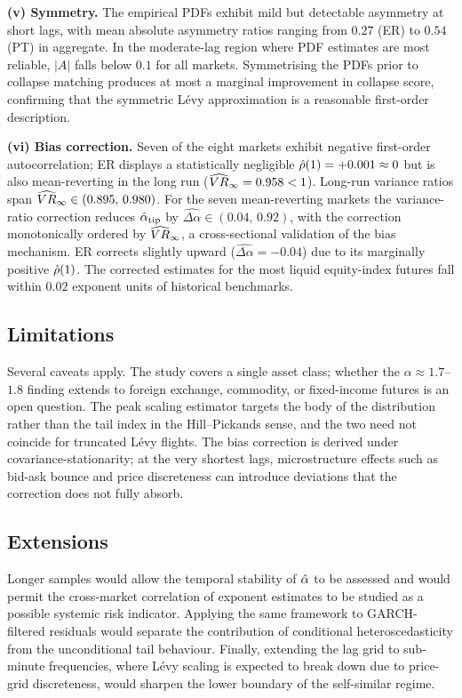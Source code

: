 \documentclass[12pt,a4paper]{article}
\begin{document}
\begin{table}[htbp]
\textbf{(v) Symmetry.}
The empirical PDFs exhibit mild but detectable asymmetry at short lags,
with mean absolute asymmetry ratios ranging from $0.27$ (ER) to $0.54$ (PT)
in aggregate.
In the moderate-lag region where PDF estimates are most reliable, $|A|$
falls below $0.1$ for all markets.
Symmetrising the PDFs prior to collapse matching produces at most a marginal
improvement in collapse score, confirming that the symmetric Lévy approximation
is a reasonable first-order description.

\textbf{(vi) Bias correction.}
Seven of the eight markets exhibit negative first-order autocorrelation; ER
displays a statistically negligible $\hat{\rho}(1)=+0.001\approx 0$ but is also
mean-reverting in the long run ($\widehat{VR}_\infty=0.958<1$).
Long-run variance ratios span $\widehat{VR}_\infty\in(0.895,\,0.980)$.
For the seven mean-reverting markets the variance-ratio correction reduces
$\hat{\alpha}_{\mathrm{tip}}$ by $\widehat{\Delta\alpha}\in(0.04,\,0.92)$, with
the correction monotonically ordered by $\widehat{VR}_\infty$, a cross-sectional
validation of the bias mechanism.
ER corrects slightly upward ($\widehat{\Delta\alpha}=-0.04$) due to its
marginally positive $\hat{\rho}(1)$.
The corrected estimates for the most liquid equity-index futures fall within
$0.02$ exponent units of historical benchmarks.

\subsection{Limitations}
Several caveats apply.
The study covers a single asset class; whether the $\alpha\approx 1.7$--$1.8$
finding extends to foreign exchange, commodity, or fixed-income futures is an
open question.
The peak scaling estimator targets the body of the distribution rather than
the tail index in the Hill--Pickands sense, and the two need not coincide for
truncated Lévy flights.
The bias correction is derived under covariance-stationarity; at the very
shortest lags, microstructure effects such as bid-ask bounce and price
discreteness can introduce deviations that the correction does not fully absorb.

\subsection{Extensions}
Longer samples would allow the temporal stability of $\hat{\alpha}$ to be assessed
and would permit the cross-market correlation of exponent estimates to be
studied as a possible systemic risk indicator.
Applying the same framework to GARCH-filtered residuals would separate the
contribution of conditional heteroscedasticity from the unconditional tail
behaviour.
Finally, extending the lag grid to sub-minute frequencies, where Lévy
scaling is expected to break down due to price-grid discreteness, would
sharpen the lower boundary of the self-similar regime.



\end{table}
\end{document}
